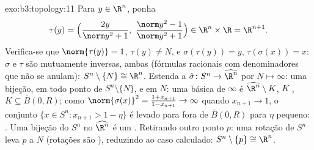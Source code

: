 \begin{solution}{exo:b3:topology:11}
Para $y \in \R^n$, ponha
\[
\tau(y) = \Bigl(\frac{2y}{\norm y^2 + 1},\ \frac{\norm y^2 -
1}{\norm y^2 + 1}\Bigr) \in \R^n\times\R = \R^{n+1}.
\]
Verifica-se que $\norm{\tau(y)} = 1$, $\tau(y) \neq N$, e
$\sigma(\tau(y)) = y$, $\tau(\sigma(x)) = x$: $\sigma$ e
$\tau$ são mutuamente inversas, ambas  (fórmulas racionais
com denominadores que não se anulam): $S^n\setminus\{N\} \cong
\R^n$. Estenda a $\hat\sigma \colon S^n \to \widehat{\R^n}$ por
$N \mapsto \infty$: uma bijeção,  em todo ponto de
$S^n\setminus\{N\}$, e em $N$: uma  básica de
$\infty$ é $\widehat{\R^n}\setminus K$, $K$ , $K
\subseteq \bar B(0, R)$; como $\norm{\sigma(x)}^2 = \frac{1 +
x_{n+1}}{1 - x_{n+1}} \to \infty$ quando $x_{n+1} \to 1$, o conjunto
$\{x \in S^n : x_{n+1} > 1 - \eta\}$ é levado para fora de $\bar B(0,R)$
para $\eta$ pequeno: . Uma bijeção  do
 $S^n$ no  $\widehat{\R^n}$ é um
. Retirando outro ponto $p$: uma rotação de $S^n$
leva $p$ a $N$ (rotações são ), reduzindo ao
caso calculado: $S^n \setminus \{p\} \cong \R^n$.
\end{solution}

